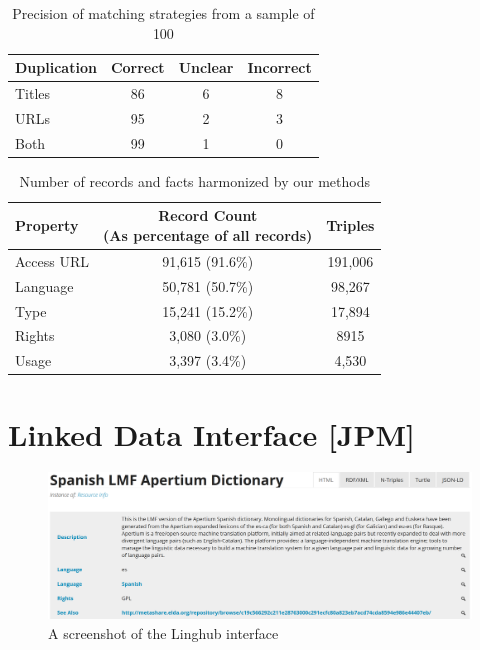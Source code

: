 \documentclass[smallextended]{svjour3}       %
\begin{document}
\begin{table}
    \begin{tabular}{l|ccc}
        Duplication & Correct & Unclear & Incorrect \\
        \hline                    
        Titles      &    86   &   6     &    8      \\ 
        URLs        &    95   &   2     &    3      \\
        Both        &    99   &   1     &    0      \\
    \end{tabular}
    \caption{\label{tab:dupe-precision}Precision of matching strategies from a
    sample of 100}
\end{table}

\begin{table}
    \begin{tabular}{l|cc}
        Property   &  \thead{Record Count\\(As percentage of all records)} & Triples \\
        \hline
        Access URL &  91,615 (91.6\%) & 191,006  \\
        Language   &  50,781 (50.7\%) & 98,267   \\
        Type       &  15,241 (15.2\%) & 17,894   \\
        Rights     &   3,080 (3.0\%)  & 8915     \\
        Usage      &   3,397 (3.4\%)  & 4,530    \\ 
    \end{tabular}
    \caption{\label{tab:total}Number of records and facts harmonized by our
    methods}
\end{table}
        



\section{Linked Data Interface [JPM]}
\label{linked-data-interface}


\begin{figure}
\includegraphics[width=\textwidth]{linghub-screenshot.png}
\caption{A screenshot of the Linghub interface\label{fig:screenshot}}
\end{figure}
\end{document}
